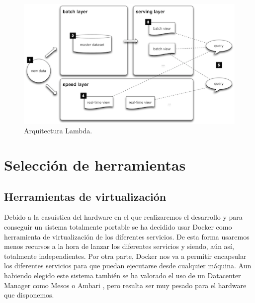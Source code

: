 \begin{figure}[htp]
\centering
\includegraphics[scale=0.70]{Imagenes/arq2.png}
\caption{Arquitectura Lambda.}
\label{arqLambda}
\end{figure}

\section{Selección de herramientas\label{toolSelect}}

\subsection{Herramientas de virtualización\label{hvirt}}
Debido a la casuística del hardware en el que realizaremos el desarrollo y
para conseguir un sistema totalmente portable se ha decidido usar Docker
como herramienta de virtualización de los diferentes servicios. De
esta forma usaremos menos recursos a la hora de lanzar los diferentes
servicios y siendo, aún así, totalmente independientes. Por otra parte, 
Docker nos va a permitir encapsular los diferentes servicios para que puedan
ejecutarse desde cualquier máquina. Aun habiendo elegido este sistema 
también se ha valorado el uso de un Datacenter Manager como Mesos o Ambari
\cite{Hrr-1}, pero resulta ser muy pesado para el hardware que disponemos.

